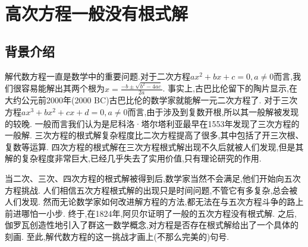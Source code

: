 \documentclass[main]{subfiles}
\begin{document}
\renewcommand{\filename}{No.9Theorem}%
\section{高次方程一般没有根式解}
\subsection{背景介绍}
解代数方程一直是数学中的重要问题.对于二次方程\(ax^2+bx+c=0,a \neq 0\)而言,我们很容易能解出其两个根为\(x= \frac{-b \pm \sqrt{b^2-4ac}}{2a}\).
事实上,古巴比伦留下的陶片显示,在大约公元前2000年(2000 BC)古巴比伦的数学家就能解一元二次方程了.
对于三次方程\(ax^3+bx^2+cx+d=0,a \neq 0\)而言,由于涉及到复数开根,所以其一般解被发现的较晚.
一般而言我们认为是尼科洛·塔尔塔利亚最早在1553年发现了三次方程的一般解.
三次方程的根式解复杂程度比二次方程提高了很多,其中包括了开三次根、复数等运算.
四次方程的根式解在三次方程根式解出现不久后就被人们发现,但是其解的复杂程度非常巨大,已经几乎失去了实用价值,只有理论研究的作用.

当二次、三次、四次方程的根式解被得到后,数学家当然不会满足,他们开始向五次方程挑战.
人们相信五次方程根式解的出现只是时间问题,不管它有多复杂,总会被人们发现.
然而无论数学家如何改进解方程的方法,都无法在与五次方程斗争的路上前进哪怕一小步.
终于,在1824年,阿贝尔证明了一般的五次方程没有根式解.
之后,伽罗瓦创造性地引入了群这一数学概念,对方程是否存在根式解给出了一个具体的刻画.
至此,解代数方程的这一挑战才画上(不那么完美的)句号.
\end{document}
